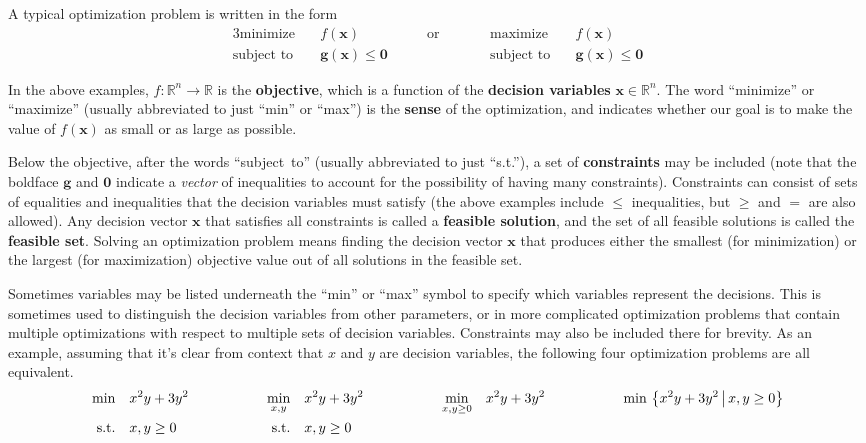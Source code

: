 \documentclass[11pt]{article}
\theoremstyle{definition} %
\begin{document}
A typical optimization problem is written in the form
\begin{alignat*}{3}
	\textrm{minimize} \quad& f(\mathbf{x}) &\qquad \text{or} \qquad&& \textrm{maximize} \quad& f(\mathbf{x}) \\
	\textrm{subject to} \quad& \mathbf{g}(\mathbf{x}) \le \mathbf{0} &&& \textrm{subject to} \quad& \mathbf{g}(\mathbf{x}) \le \mathbf{0}
\end{alignat*}

In the above examples, $f : \mathbb{R}^n \to \mathbb{R}$ is the \textbf{objective}, which is a function of the \textbf{decision variables} $\mathbf{x} \in \mathbb{R}^n$. The word ``minimize'' or ``maximize'' (usually abbreviated to just ``min'' or ``max'') is the \textbf{sense} of the optimization, and indicates whether our goal is to make the value of $f(\mathbf{x})$ as small or as large as possible.

Below the objective, after the words ``subject~to'' (usually abbreviated to just ``s.t.''), a set of \textbf{constraints} may be included (note that the boldface $\mathbf{g}$ and $\mathbf{0}$ indicate a \textit{vector} of inequalities to account for the possibility of having many constraints). Constraints can consist of sets of equalities and inequalities that the decision variables must satisfy (the above examples include $\le$ inequalities, but $\ge$ and $=$ are also allowed). Any decision vector $\mathbf{x}$ that satisfies all constraints is called a \textbf{feasible solution}, and the set of all feasible solutions is called the \textbf{feasible set}. Solving an optimization problem means finding the decision vector $\mathbf{x}$ that produces either the smallest (for minimization) or the largest (for maximization) objective value out of all solutions in the feasible set.

Sometimes variables may be listed underneath the ``min'' or ``max'' symbol to specify which variables represent the decisions. This is sometimes used to distinguish the decision variables from other parameters, or in more complicated optimization problems that contain multiple optimizations with respect to multiple sets of decision variables. Constraints may also be included there for brevity. As an example, assuming that it's clear from context that $x$ and $y$ are decision variables, the following four optimization problems are all equivalent.
\begin{alignat*}{7}
	\min \quad& x^2 y + 3y^2 &\hspace{0.5in}&& \min_{x,y} \quad& x^2 y + 3y^2 &\hspace{0.5in}&& \min_{x,y \ge 0} \quad& x^2 y + 3y^2 &\hspace{0.5in}&& \min \, \left\{ x^2 y + 3y^2 \, \middle| \, x,y \ge 0 \right\} \\
	\mathrm{s.t.} \quad& x,y \ge 0 &&& \mathrm{s.t.} \quad& x,y \ge 0
\end{alignat*}
\end{document}
